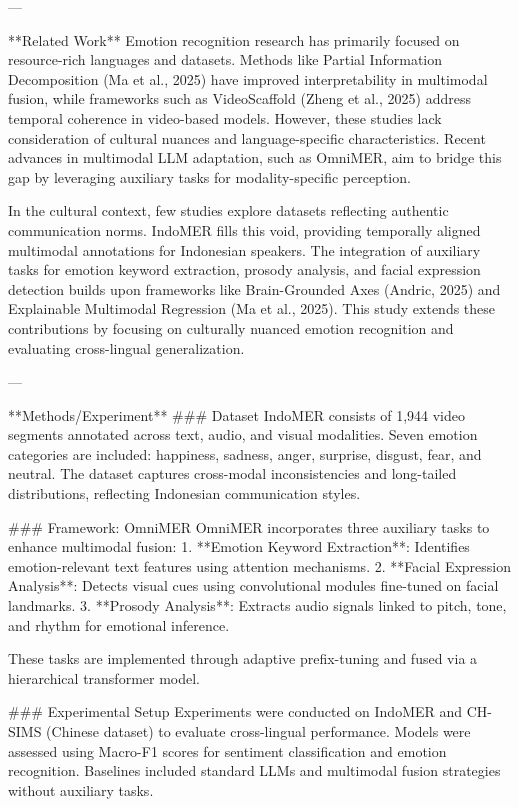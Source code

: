 ---

**Related Work**  
Emotion recognition research has primarily focused on resource-rich languages and datasets. Methods like Partial Information Decomposition (Ma et al., 2025) have improved interpretability in multimodal fusion, while frameworks such as VideoScaffold (Zheng et al., 2025) address temporal coherence in video-based models. However, these studies lack consideration of cultural nuances and language-specific characteristics. Recent advances in multimodal LLM adaptation, such as OmniMER, aim to bridge this gap by leveraging auxiliary tasks for modality-specific perception.  

In the cultural context, few studies explore datasets reflecting authentic communication norms. IndoMER fills this void, providing temporally aligned multimodal annotations for Indonesian speakers. The integration of auxiliary tasks for emotion keyword extraction, prosody analysis, and facial expression detection builds upon frameworks like Brain-Grounded Axes (Andric, 2025) and Explainable Multimodal Regression (Ma et al., 2025). This study extends these contributions by focusing on culturally nuanced emotion recognition and evaluating cross-lingual generalization.  

---

**Methods/Experiment**  
### Dataset  
IndoMER consists of 1,944 video segments annotated across text, audio, and visual modalities. Seven emotion categories are included: happiness, sadness, anger, surprise, disgust, fear, and neutral. The dataset captures cross-modal inconsistencies and long-tailed distributions, reflecting Indonesian communication styles.  

### Framework: OmniMER  
OmniMER incorporates three auxiliary tasks to enhance multimodal fusion:  
1. **Emotion Keyword Extraction**: Identifies emotion-relevant text features using attention mechanisms.  
2. **Facial Expression Analysis**: Detects visual cues using convolutional modules fine-tuned on facial landmarks.  
3. **Prosody Analysis**: Extracts audio signals linked to pitch, tone, and rhythm for emotional inference.  

These tasks are implemented through adaptive prefix-tuning and fused via a hierarchical transformer model.  

### Experimental Setup  
Experiments were conducted on IndoMER and CH-SIMS (Chinese dataset) to evaluate cross-lingual performance. Models were assessed using Macro-F1 scores for sentiment classification and emotion recognition. Baselines included standard LLMs and multimodal fusion strategies without auxiliary tasks.  

